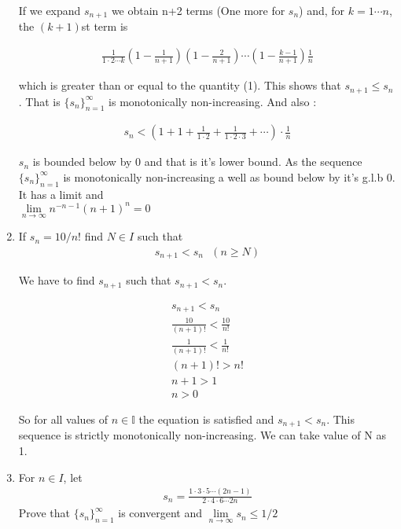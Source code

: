 \documentclass[11pt, letterpaper]{article}
\begin{document}
\begin{enumerate}
{	If we expand $s_{n+1}$ we obtain n+2 terms (One more for $s_n$) and, for $k=1 \cdots n$, the $(k+1)$st term is
	
	\begin{align*}
		\frac{1}{1 \cdot2 \cdots k} \left( 1 - \frac{1}{n+1}\right) \left( 1 - \frac{2}{n+1}\right)\cdots \left( 1 - \frac{k-1}{n+1}\right) \frac{1}{n}
	\end{align*}
	
	which is greater than or equal to the quantity (1). This shows that $s_{n+1} \leq s_{n}$. That is $ \lbrace s_n \rbrace_{n=1}^\infty $ is monotonically non-increasing. And also :
	
	\begin{eqnarray}
		s_n < \left(1 + 1 + \frac{1}{1\cdot 2} + \frac{1}{1 \cdot 2 \cdot 3} + \cdots \right) \cdot \frac{1}{n}
	\end{eqnarray}
	
	$s_n$ is bounded below by 0 and that is it's lower bound. As the sequence $ \lbrace s_n \rbrace_{n=1}^\infty $ is monotonically non-increasing a well as bound below by it's g.l.b 0. It has a limit and \\
	$\lim \limits_{n \to \infty} n^{-n-1}(n+1)^n = 0$
}

\item{If $s_n = 10/n!$ find $N \in I$ such that
	\begin{align*}
		s_{n+1} < s_n \,\,\,\, (n \geq N)
	\end{align*}
	
	We have to find $s_{n+1}$ such that $s_{n+1} < s_n$.
	
	\setcounter{equation}{0}
	
	\begin{eqnarray*}
		s_{n+1} < s_n \\
		\frac{10}{(n+1)!} < \frac{10}{n!} \\
		\frac{1}{(n+1)!} < \frac{1}{n!} \\
		(n+1)! > n! \\
		n+1 > 1 \\
		n > 0
	\end{eqnarray*}
	
	So for all values of $n \in \mathbb{I}$ the equation is satisfied and $s_{n+1} < s_n$. This sequence is strictly monotonically non-increasing. We can take value of N as 1.
}

\item{For $n \in I$, let
	\begin{align*}
		s_n = \frac{1 \cdot 3 \cdot 5 \cdots (2n-1)}{2 \cdot 4 \cdot 6 \cdots 2n}
	\end{align*}
	Prove that $ \lbrace s_n \rbrace_{n=1}^\infty $ is convergent and $\lim \limits_{n \to \infty} s_n \leq 1/2$\\\\
	
}
\end{enumerate}
\end{document}
